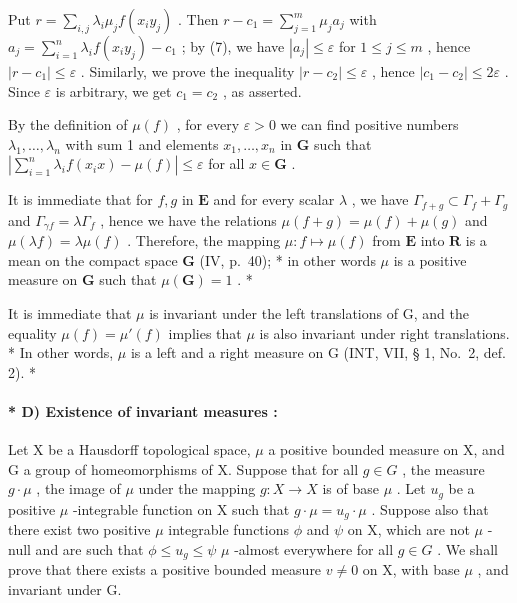 Put \(r = \sum_{i,j} \lambda_i \mu_j f(x_i y_j)\) . Then \(r - c_1 = \sum_{j=1}^{m} \mu_j a_j\) with \(a_j = \sum_{i=1}^{n} \lambda_i f(x_i y_j) - c_1\) ; by (7), we have \(|a_j| \leqslant \varepsilon\) for \(1 \leqslant j \leqslant m\) , hence \(|r - c_1| \leqslant \varepsilon\) . Similarly, we prove the inequality \(|r - c_2| \leqslant \varepsilon\) , hence \(|c_1 - c_2| \leqslant 2\varepsilon\) . Since \(\varepsilon\) is arbitrary, we get \(c_1 = c_2\) , as asserted.

By the definition of \(\mu(f)\) , for every \(\varepsilon > 0\) we can find positive numbers \(\lambda_1, \ldots, \lambda_n\) with sum 1 and elements \(x_1, \ldots, x_n\) in \(\mathbf{G}\) such that \(\left|\sum_{i=1}^{n} \lambda_i f(x_i x) - \mu(f)\right| \leqslant \varepsilon\) for all \(x \in \mathbf{G}\) .

It is immediate that for \(f, g\) in \(\mathbf{E}\) and for every scalar \(\lambda\) , we have \(\Gamma_{f + g} \subset \Gamma_f + \Gamma_g\) and \(\Gamma_{\gamma f} = \lambda \Gamma_f\) , hence we have the relations \(\mu(f + g) = \mu(f) + \mu(g)\) and \(\mu(\lambda f) = \lambda \mu(f)\) . Therefore, the mapping \(\mu : f \mapsto \mu(f)\) from \(\mathbf{E}\) into \(\mathbf{R}\) is a mean on the compact space \(\mathbf{G}\) (IV, p.~40); * in other words \(\mu\) is a positive measure on \(\mathbf{G}\) such that \(\mu(\mathbf{G}) = 1\) . *

It is immediate that \(\mu\) is invariant under the left translations of G, and the equality \(\mu(f) = \mu'(f)\) implies that \(\mu\) is also invariant under right translations. * In other words, \(\mu\) is a left and a right measure on G (INT, VII, § 1, No.~2, def. 2). *

\paragraph{* D) Existence of invariant measures :}

Let X be a Hausdorff topological space, \(\mu\) a positive bounded measure on X, and G a group of homeomorphisms of X. Suppose that for all \(g \in G\) , the measure \(g \cdot \mu\) , the image of \(\mu\) under the mapping \(g : X \to X\) is of base \(\mu\) . Let \(u_g\) be a positive \(\mu\) -integrable function on X such that \(g \cdot \mu = u_g \cdot \mu\) . Suppose also that there exist two positive \(\mu\) integrable functions \(\phi\) and \(\psi\) on X, which are not \(\mu\) -null and are such that \(\phi \leqslant u_g \leqslant \psi\) \(\mu\) -almost everywhere for all \(g \in G\) . We shall prove that there exists a positive bounded measure \(v \neq 0\) on X, with base \(\mu\) , and invariant under G.

